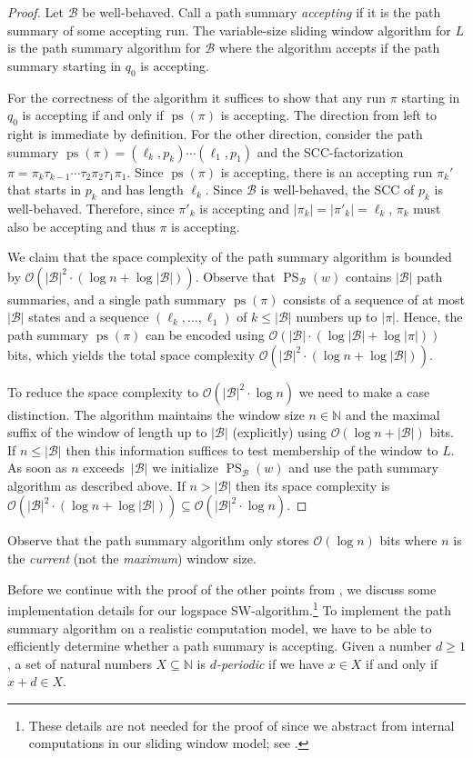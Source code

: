 \documentclass{theoretics}
\newcommand{\N}{\mathbb{N}}
\newcommand{\B}{\mathcal{B}}
\renewcommand{\O}{\mathcal{O}}
\DeclareMathOperator{\ps}{ps}
\DeclareMathOperator{\PS}{PS}
\renewcommand{\geq}{\geqslant}
\renewcommand{\leq}{\leqslant}
\renewcommand{\ge}{\geq}
\renewcommand{\le}{\leq}
\begin{document}
\begin{proof}
	Let $\B$ be well-behaved.
	Call a path summary {\em accepting} if it is the path summary of some accepting run.
	The variable-size sliding window algorithm for $L$ is the path summary algorithm for $\B$
	where the algorithm accepts if the path summary starting in $q_0$ is accepting.
	
	For the correctness of the algorithm it suffices to show that
	any run $\pi$ starting in $q_0$ is accepting
	if and only if $\ps(\pi)$ is accepting.
	The direction from left to right is immediate by definition.
	For the other direction, consider the path summary $\ps(\pi) = (\ell_k,p_k) \cdots (\ell_1,p_1)$
	and the SCC-factorization $\pi = \pi_k \tau_{k-1} \cdots \tau_2 \pi_2 \tau_1 \pi_1$.
	Since $\ps(\pi)$ is accepting, there is an accepting run $\pi_k'$
	that starts in $p_k$ and has length $\ell_k$.
	Since $\B$ is well-behaved, the SCC of $p_k$ is well-behaved.
	Therefore, since $\pi'_k$ is accepting and $|\pi_k|=|\pi'_k|=\ell_k$, $\pi_k$ must also be accepting and
	thus $\pi$ is accepting.
	
	We claim that the space complexity of the path summary algorithm is bounded by $\O(|\B|^2 \cdot (\log n + \log |\B|))$.
	Observe that $\PS_\B(w)$ contains $|\B|$ path summaries,
	and a single path summary $\ps(\pi)$ consists of a sequence of at most $|\B|$ states
	and a sequence $(\ell_k, \dots, \ell_1)$ of 
	$k \le |\B|$ numbers up to $|\pi|$.
	Hence, the path summary $\ps(\pi)$ can be encoded using $\O(|\B| \cdot (\log |\B| + \log |\pi|))$ bits, which yields the total
	space complexity $\O(|\B|^2 \cdot (\log n + \log |\B|))$.
	
	To reduce the space complexity to $\O(|\B|^2 \cdot \log n)$ we need to make a case distinction.
	The algorithm maintains the window size $n \in \N$ and the maximal suffix of the window of length up to $|\B|$
	(explicitly) using $\O(\log n + |\B|)$ bits.
	If $n \le |\B|$ then this information suffices to test membership of the window to $L$.
	As soon as $n$ exceeds~$|\B|$ we initialize $\PS_\B(w)$ and use the path summary algorithm
	as described above.
	If $n > |\B|$ then its space complexity is
	$\O(|\B|^2 \cdot (\log n + \log  |\B|)) \subseteq \O(|\B|^2 \cdot \log n)$.
\end{proof}

Observe that the path summary algorithm only stores $\O(\log n)$ bits
where $n$ is the \emph{current} (not the \emph{maximum}) window size.

Before we continue with the proof of the other points from , 
we discuss some implementation details for our logspace SW-algorithm.\footnote{These details are not needed for the proof of 
since we abstract from internal computations in our sliding window model; see .}
To implement the path summary algorithm on a realistic computation model,
we have to be able to efficiently determine whether a path summary is accepting.
Given a number $d \ge 1$,
a set of natural numbers $X \subseteq \N$ is {\em $d$-periodic}
if we have $x \in X$ if and only if $x + d \in X$.
\end{document}
